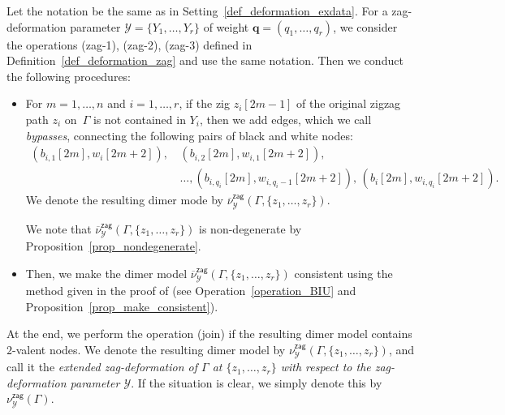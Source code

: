 \documentclass[pdftex]{sigma}%
\numberwithin{equation}{section}
\numberwithin{figure}{section}
\numberwithin{table}{section}
\newcommand{\calY}{\mathcal{Y}}
\newcommand{\bfq}{\mathbf{q}}
\newcommand{\zag}{\mathsf{zag}}
\begin{document}
\begin{Definition}\label{def_exdeformation_zag}
Let the notation be the same as in Setting~\ref{def_deformation_exdata}.
For a zag-deformation parameter $\calY=\{Y_1,\dots,Y_r\}$ of weight $\bfq=(q_1,\dots,q_r)$, we consider
the operations (zag-1), (zag-2), (zag-3) defined in Definition~\ref{def_deformation_zag} and use the same notation.
Then we conduct the following procedures:

\begin{itemize}\itemsep=0pt
\setlength{\parskip}{0pt}
\setlength{\leftskip}{0.4cm}
\item[(\text{zag}-4)]
For $m=1,\dots,n$ and $i=1, \dots, r$, if the zig $z_i[2m-1]$ of the original zigzag path $z_i$ on~$\Gamma$ is not contained in $Y_i$,
then we add edges, which we call \emph{bypasses}, connecting the following pairs of black and white nodes:
\begin{align*}
(b_{i,1}[2m],w_i[2m+2]), \,& (b_{i,2}[2m],w_{i,1}[2m+2]), \\ &\dots, (b_{i,q_i}[2m],w_{i,q_i-1}[2m+2]), \, (b_i[2m],w_{i,q_i}[2m+2]).
\end{align*}
We denote the resulting dimer mode by $\overline{\nu}^\zag_\calY(\Gamma, \{z_1,\dots,z_r\})$.

We note that $\overline{\nu}^\zag_\calY(\Gamma, \{z_1,\dots,z_r\})$ is non-degenerate by Proposition~\ref{prop_nondegenerate}.
\item[(\text{zag}-5)]
Then, we make the dimer model $\overline{\nu}^\zag_\calY(\Gamma, \{z_1,\dots,z_r\})$ consistent using the method given in the proof of \cite[Theorem~1.1]{BIU} (see Operation~\ref{operation_BIU} and Proposition~\ref{prop_make_consistent}).
\end{itemize}

At the end, we perform the operation (join) if the resulting dimer model contains $2$-valent nodes.
We denote the resulting dimer model by $\nu^\zag_\calY(\Gamma, \{z_1,\dots,z_r\})$, and call it the \emph{extended zag-deformation of $\Gamma$ at $\{z_1,\dots,z_r\}$ with respect to the zag-deformation parameter $\calY$}.
If the situation is clear, we simply denote this by $\nu^\zag_\calY(\Gamma)$.
\end{Definition}
\end{document}
